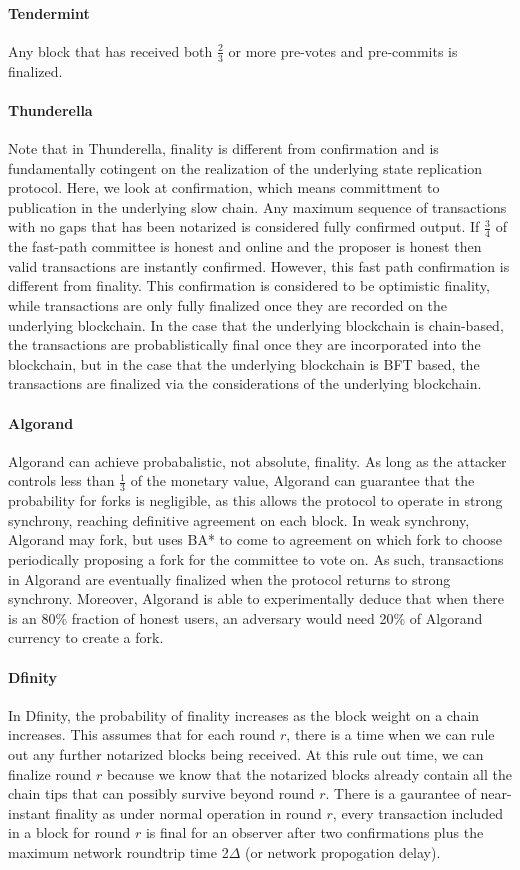 \documentclass[10pt,journal,compsoc]{IEEEtran}
\begin{document}
\paragraph{Tendermint} Any block that has received both \(\frac{2}{3}\) or more pre-votes and pre-commits is finalized. 

\paragraph{Thunderella} Note that in Thunderella, finality is different from confirmation and is fundamentally cotingent on the realization of the underlying state replication protocol. Here, we look at confirmation, which means committment to publication in the underlying slow chain. Any maximum sequence of transactions with no gaps that has been notarized is considered fully confirmed output. If \(\frac{3}{4}\) of the fast-path committee is honest and online and the proposer is honest then valid transactions are instantly confirmed. However, this fast path confirmation is different from finality. This confirmation is considered to be optimistic finality, while transactions are only fully finalized once they are recorded on the underlying blockchain. In the case that the underlying blockchain is chain-based, the transactions are probablistically final once they are incorporated into the blockchain, but in the case that the underlying blockchain is BFT based, the transactions are finalized via the considerations of the underlying blockchain.

\paragraph{Algorand} Algorand can achieve probabalistic, not absolute, finality. As long as the attacker controls less than \(\frac{1}{3}\) of the monetary value, Algorand can guarantee that the probability for forks is negligible, as this allows the protocol to operate in strong synchrony, reaching definitive agreement on each block. In weak synchrony, Algorand may fork, but uses BA* to come to agreement on which fork to choose periodically proposing a fork for the committee to vote on. As such, transactions in Algorand are eventually finalized when the protocol returns to strong synchrony. Moreover, Algorand is able to experimentally deduce that when there is an 80\% fraction of honest users, an adversary would need 20\% of Algorand currency to create a fork.

\paragraph{Dfinity}
In Dfinity, the probability of finality increases as the block weight on a chain increases. This assumes that for each round $r$, there is a time when we can rule out any further notarized blocks being received. At this rule out time, we can finalize round $r$ because we know that the notarized blocks already contain all the chain tips that can possibly survive beyond round $r$. There is a gaurantee of near-instant finality as under normal operation in round $r$, every transaction included in a block for round $r$ is final for an observer after two confirmations plus the maximum network roundtrip time 2$\Delta$ (or network propogation delay).  
\end{document}
